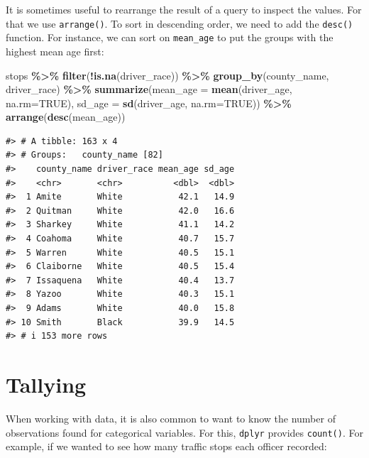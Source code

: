 \documentclass[
]{book}
\newenvironment{Shaded}{\begin{snugshade}}{\end{snugshade}}
\newcommand{\AttributeTok}[1]{\textcolor[rgb]{0.13,0.29,0.53}{#1}}
\newcommand{\ConstantTok}[1]{\textcolor[rgb]{0.56,0.35,0.01}{#1}}
\newcommand{\FunctionTok}[1]{\textcolor[rgb]{0.13,0.29,0.53}{\textbf{#1}}}
\newcommand{\NormalTok}[1]{#1}
\newcommand{\SpecialCharTok}[1]{\textcolor[rgb]{0.81,0.36,0.00}{\textbf{#1}}}
\begin{document}
It is sometimes useful to rearrange the result of a query to inspect the values. For that we use \texttt{arrange()}. To sort in descending order, we need to add the \texttt{desc()} function. For instance, we can sort on \texttt{mean\_age} to put the groups with the highest mean age first:

\begin{Shaded}
\begin{Highlighting}[]
\NormalTok{stops }\SpecialCharTok{\%\textgreater{}\%}
  \FunctionTok{filter}\NormalTok{(}\SpecialCharTok{!}\FunctionTok{is.na}\NormalTok{(driver\_race)) }\SpecialCharTok{\%\textgreater{}\%} 
  \FunctionTok{group\_by}\NormalTok{(county\_name, driver\_race) }\SpecialCharTok{\%\textgreater{}\%}
  \FunctionTok{summarize}\NormalTok{(}\AttributeTok{mean\_age =} \FunctionTok{mean}\NormalTok{(driver\_age, }\AttributeTok{na.rm=}\ConstantTok{TRUE}\NormalTok{),}
            \AttributeTok{sd\_age =} \FunctionTok{sd}\NormalTok{(driver\_age, }\AttributeTok{na.rm=}\ConstantTok{TRUE}\NormalTok{)) }\SpecialCharTok{\%\textgreater{}\%} 
  \FunctionTok{arrange}\NormalTok{(}\FunctionTok{desc}\NormalTok{(mean\_age))}
\end{Highlighting}
\end{Shaded}

\begin{verbatim}
#> # A tibble: 163 x 4
#> # Groups:   county_name [82]
#>    county_name driver_race mean_age sd_age
#>    <chr>       <chr>          <dbl>  <dbl>
#>  1 Amite       White           42.1   14.9
#>  2 Quitman     White           42.0   16.6
#>  3 Sharkey     White           41.1   14.2
#>  4 Coahoma     White           40.7   15.7
#>  5 Warren      White           40.5   15.1
#>  6 Claiborne   White           40.5   15.4
#>  7 Issaquena   White           40.4   13.7
#>  8 Yazoo       White           40.3   15.1
#>  9 Adams       White           40.0   15.8
#> 10 Smith       Black           39.9   14.5
#> # i 153 more rows
\end{verbatim}

\hypertarget{tallying}{%
\section{Tallying}\label{tallying}}

When working with data, it is also common to want to know the number of
observations found for categorical variables. For this, \texttt{dplyr}
provides \texttt{count()}. For example, if we wanted to see how many traffic stops each officer recorded:
\end{document}
